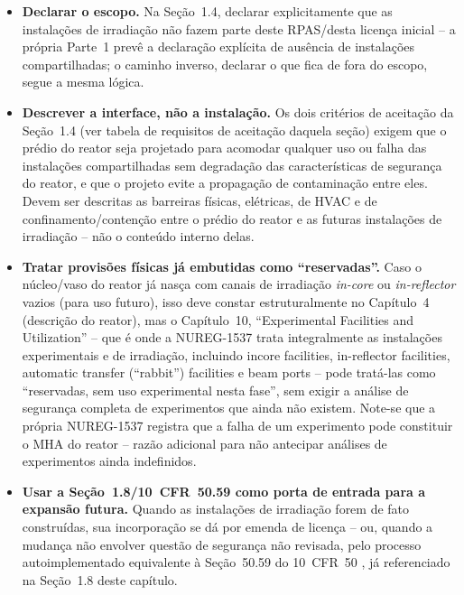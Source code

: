 \begin{itemize}
\item \textbf{Declarar o escopo.} Na Se\c{c}\~ao~1.4, declarar
  explicitamente que as instala\c{c}\~oes de irradia\c{c}\~ao n\~ao fazem
  parte deste RPAS/desta licen\c{c}a inicial -- a pr\'opria Parte~1
  \citep{nureg1537p1} prev\^e a declara\c{c}\~ao expl\'icita de aus\^encia
  de instala\c{c}\~oes compartilhadas; o caminho inverso, declarar o que
  fica de fora do escopo, segue a mesma l\'ogica.
\item \textbf{Descrever a interface, n\~ao a instala\c{c}\~ao.} Os dois
  crit\'erios de aceita\c{c}\~ao da Se\c{c}\~ao~1.4 (ver tabela de
  requisitos de aceita\c{c}\~ao daquela se\c{c}\~ao) exigem que o pr\'edio
  do reator seja projetado para acomodar qualquer uso ou falha das
  instala\c{c}\~oes compartilhadas sem degrada\c{c}\~ao das
  caracter\'isticas de seguran\c{c}a do reator, e que o projeto evite a
  propaga\c{c}\~ao de contamina\c{c}\~ao entre eles. Devem ser descritas
  as barreiras f\'isicas, el\'etricas, de HVAC e de
  confinamento/conten\c{c}\~ao entre o pr\'edio do reator e as futuras
  instala\c{c}\~oes de irradia\c{c}\~ao -- n\~ao o conte\'udo interno
  delas.
\item \textbf{Tratar provis\~oes f\'isicas j\'a embutidas como
  ``reservadas''.} Caso o n\'ucleo/vaso do reator j\'a nasça com canais de
  irradia\c{c}\~ao \emph{in-core} ou \emph{in-reflector} vazios (para uso
  futuro), isso deve constar estruturalmente no Cap\'itulo~4
  (descri\c{c}\~ao do reator), mas o Cap\'itulo~10, ``Experimental
  Facilities and Utilization'' \citep{nureg1537p1} -- que \'e onde a
  NUREG-1537 trata integralmente as instala\c{c}\~oes experimentais e de
  irradia\c{c}\~ao, incluindo incore facilities, in-reflector facilities,
  automatic transfer (``rabbit'') facilities e beam ports -- pode
  trat\'a-las como ``reservadas, sem uso experimental nesta fase'', sem
  exigir a an\'alise de seguran\c{c}a completa de experimentos que ainda
  n\~ao existem. Note-se que a pr\'opria NUREG-1537 registra que a falha
  de um experimento pode constituir o MHA do reator -- raz\~ao adicional
  para não antecipar an\'alises de experimentos ainda indefinidos.
\item \textbf{Usar a Se\c{c}\~ao~1.8/10~CFR~50.59 como porta de entrada
  para a expans\~ao futura.} Quando as instala\c{c}\~oes de
  irradia\c{c}\~ao forem de fato constru\'idas, sua incorpora\c{c}\~ao se
  d\'a por emenda de licen\c{c}a -- ou, quando a mudan\c{c}a n\~ao
  envolver quest\~ao de seguran\c{c}a n\~ao revisada, pelo processo
  autoimplementado equivalente \`a Se\c{c}\~ao~50.59 do 10~CFR~50
  \citep{cfr10p50}, j\'a referenciado na Se\c{c}\~ao~1.8 deste cap\'itulo.
\end{itemize}

